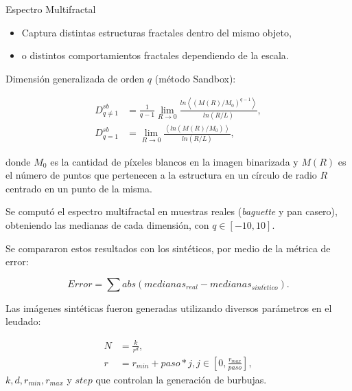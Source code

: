\documentclass[spanish,unknownkeysallowed]{beamer}
\begin{document}
\begin{frame}

Espectro Multifractal

\begin{itemize}
\item Captura distintas estructuras fractales dentro del mismo objeto,
\item o distintos comportamientos fractales dependiendo de la escala.
\end{itemize}

Dimensión generalizada de orden $q$ (método Sandbox):

 \begin{align*}
D_{q\ne 1}^{sb} &= \frac{1}{q-1} \lim_{R \rightarrow 0}{
\frac{ln   { \left\langle  (M(R)/M_{0})^{q-1} \right\rangle   }}
{ln {(R/L)}       }},\\
D_{q=1}^{sb} &= \lim_{R \rightarrow 0}{
\frac{ \left\langle ln   { (M(R)/M_{0})  }  \right\rangle}
{ln {(R/L)}       }},
\end{align*}

\noindent donde $M_{0}$ es la cantidad de píxeles blancos en la imagen binarizada y $M(R)$ es el número de puntos que pertenecen a la estructura en un círculo de radio $R$ centrado en un punto de la misma.
\end{frame}

\begin{frame}
Se computó el espectro multifractal en muestras reales ({\em baguette} y pan casero), obteniendo las medianas de cada dimensión, con $q \in [-10,10]$.

Se compararon estos resultados con los sintéticos, por medio de la métrica de error:

\begin{equation*}
Error = \displaystyle \sum abs(medianas_{real}-medianas_{sint\acute{e}tico}).
\end{equation*}

Las imágenes sintéticas fueron generadas utilizando diversos parámetros en el leudado:

\begin{align*}
N &= \frac{k}{r^{d}},\\ r &= r_{min}+paso*j, j \in [0,\frac{r_{max}}{paso}],
\end{align*}
\noindent $k,d,r_{min},r_{max}$ y $step$ que controlan la generación de burbujas.

\end{frame}
\end{document}

